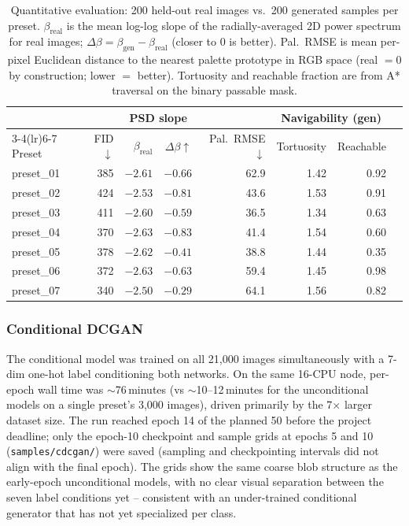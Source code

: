 \documentclass[11pt]{article}
\begin{document}
\begin{table}[h]
\centering
\caption{Quantitative evaluation: 200 held-out real images vs.\ 200 generated
         samples per preset.
         $\beta_{\text{real}}$ is the mean log-log slope of the
         radially-averaged 2D power spectrum for real images;
         $\Delta\beta = \beta_{\text{gen}} - \beta_{\text{real}}$
         (closer to 0 is better).
         Pal.\ RMSE is mean per-pixel Euclidean distance to the nearest
         palette prototype in RGB space (real $= 0$ by construction;
         lower $=$ better).
         Tortuosity and reachable fraction are from A* traversal on the
         binary passable mask.}
\label{tab:metrics}
\small
\begin{tabular}{lrrrrrrr}
\toprule
 & & \multicolumn{2}{c}{PSD slope} & & \multicolumn{2}{c}{Navigability (gen)} \\
\cmidrule(lr){3-4}\cmidrule(lr){6-7}
Preset & FID$\downarrow$ & $\beta_{\text{real}}$ & $\Delta\beta$$\uparrow$
       & Pal.\ RMSE$\downarrow$ & Tortuosity & Reachable \\
\midrule
preset\_01 & 385 & $-2.61$ & $-0.66$ & 62.9 & 1.42 & 0.92 \\
preset\_02 & 424 & $-2.53$ & $-0.81$ & 43.6 & 1.53 & 0.91 \\
preset\_03 & 411 & $-2.60$ & $-0.59$ & 36.5 & 1.34 & 0.63 \\
preset\_04 & 370 & $-2.63$ & $-0.83$ & 41.4 & 1.54 & 0.60 \\
preset\_05 & 378 & $-2.62$ & $-0.41$ & 38.8 & 1.44 & 0.35 \\
preset\_06 & 372 & $-2.63$ & $-0.63$ & 59.4 & 1.45 & 0.98 \\
preset\_07 & 340 & $-2.50$ & $-0.29$ & 64.1 & 1.56 & 0.82 \\
\bottomrule
\end{tabular}
\end{table}

\subsubsection*{Conditional DCGAN}
The conditional model was trained on all 21{,}000 images simultaneously with
a 7-dim one-hot label conditioning both networks. On the same 16-CPU node,
per-epoch wall time was $\sim$76\,minutes (vs $\sim$10--12\,minutes for the
unconditional models on a single preset's 3{,}000 images), driven primarily
by the 7$\times$ larger dataset size. The run reached epoch 14 of the planned
50 before the project deadline; only the epoch-10 checkpoint and sample grids
at epochs 5 and 10 (\texttt{samples/cdcgan/}) were saved (sampling and
checkpointing intervals did not align with the final epoch). The grids show
the same coarse blob structure as the early-epoch unconditional models, with
no clear visual separation between the seven label conditions yet --
consistent with an under-trained conditional generator that has not yet
specialized per class.
\end{document}
